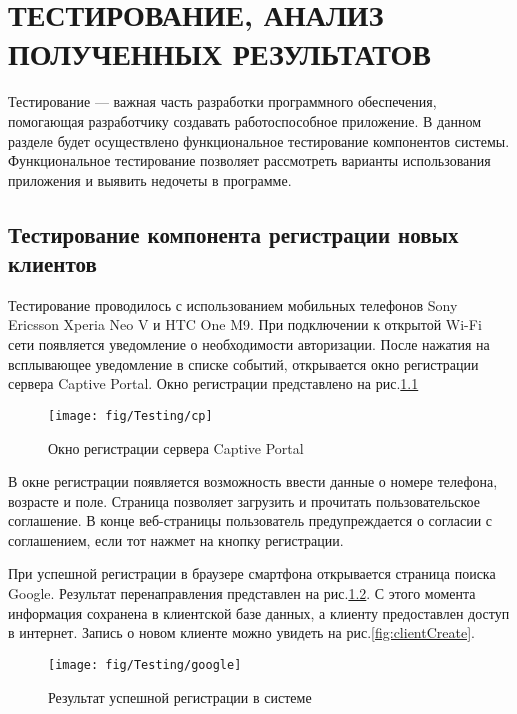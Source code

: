 \chapter{ТЕСТИРОВАНИЕ, АНАЛИЗ ПОЛУЧЕННЫХ РЕЗУЛЬТАТОВ}

Тестирование --- важная часть разработки программного обеспечения, помогающая разработчику создавать работоспособное приложение. В данном разделе будет осуществлено функциональное тестирование компонентов системы. Функциональное тестирование позволяет рассмотреть варианты использования приложения и выявить недочеты в программе.

\section{Тестирование компонента регистрации новых клиентов}

Тестирование проводилось с использованием мобильных телефонов Sony Ericsson Xperia Neo V и HTC One M9.
При подключении к открытой Wi-Fi сети появляется уведомление о необходимости авторизации. После нажатия на всплывающее уведомление в списке событий, открывается окно регистрации сервера Captive Portal. Окно регистрации представлено на рис.\ref{fig:cp}

\begin{figure}[h]
	\centering
	\texttt{[image: fig/Testing/cp]}
	\caption{Окно регистрации сервера Captive Portal}
	\label{fig:cp}
\end{figure}

В окне регистрации появляется возможность ввести данные о номере телефона, возрасте и поле. Страница позволяет загрузить и прочитать пользовательское соглашение. В конце веб-страницы пользователь предупреждается о согласии с соглашением, если тот нажмет на кнопку регистрации. 

При успешной регистрации в браузере смартфона открывается страница поиска Google. Результат перенаправления представлен на рис.\ref{fig:google}. С этого момента информация сохранена в клиентской базе данных, а клиенту предоставлен доступ в интернет. Запись о новом клиенте можно увидеть на рис.\ref{fig:clientCreate}.

\begin{figure}[h]
	\centering
	\texttt{[image: fig/Testing/google]}
	\caption{Результат успешной регистрации в системе}
	\label{fig:google}
\end{figure}

